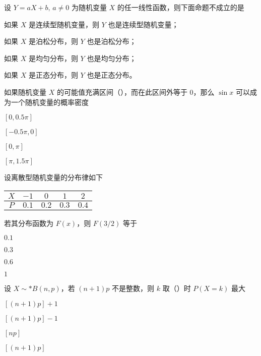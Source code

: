 \documentclass{exam-zh}
\begin{document}
\begin{question}
  设 $Y = aX + b, \, a \neq 0$ 为随机变量 $X$ 的任一线性函数，则下面命题不成立的是 \paren[B]
  \begin{choices}
    \item 如果 $X$ 是连续型随机变量，则 $Y$ 也是连续型随机变量；  
    \item 如果 $X$ 是泊松分布，则 $Y$ 也是泊松分布；  
    \item 如果 $X$ 是均匀分布，则 $Y$ 也是均匀分布；  
    \item 如果 $X$ 是正态分布，则 $Y$ 也是正态分布。  
  \end{choices}
\end{question}

\begin{question}
  如果随机变量 $X$ 的可能值充满区间（\quad ），而在此区间外等于 $0$，那么 $\sin x$ 可以成为一个随机变量的概率密度 \paren[A]
  \begin{choices}
    \item $[0, 0.5\pi]$  
    \item $[-0.5\pi, 0]$  
    \item $[0, \pi]$  
    \item $[\pi, 1.5\pi]$  
  \end{choices}
\end{question}

\begin{question}
  设离散型随机变量的分布律如下  
  \begin{table}[H]
    \centering
    \begin{tabular}{|c|c|c|c|c|}
    \hline
    $X$ & $-1$ & $0$ & $1$ & $2$ \\
    \hline
    $P$ & $0.1$ & $0.2$ & $0.3$ & $0.4$ \\
    \hline
    \end{tabular}
  \end{table}

  若其分布函数为 $F(x)$，则 $F(3/2)$ 等于 \paren[C]
  \begin{choices}
    \item $0.1$  
    \item $0.3$  
    \item $0.6$  
    \item $1$  
  \end{choices}
\end{question}

\begin{question}
  设 $X \sim* B(n, p)$，若 $(n+1)p$ 不是整数，则 $k$ 取（\quad ）时 $P(X = k)$ 最大 \paren[D]
  \begin{choices}
    \item $[(n+1)p] + 1$  
    \item $[(n+1)p] - 1$  
    \item $[np]$  
    \item $[(n+1)p]$  
  \end{choices}
\end{question}
\end{document}
